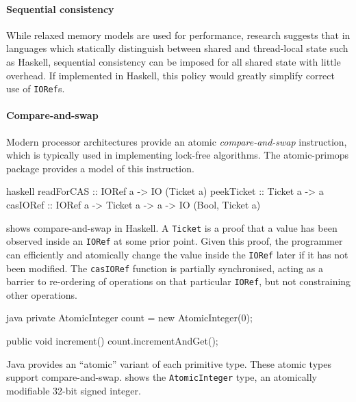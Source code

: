 \paragraph{Sequential consistency}
While relaxed memory models are used for performance, research
suggests that in languages which statically distinguish between shared
and thread-local state such as Haskell, sequential consistency can be
imposed for all shared state with little overhead\cite{vollmer2017}.
If implemented in Haskell, this policy would greatly simplify correct
use of \verb|IORef|s.

\paragraph{Compare-and-swap}
Modern processor architectures provide an atomic
\emph{compare-and-swap} instruction, which is typically used in
implementing lock-free algorithms\cite{dice2013}.  The
atomic-primops package\cite{atomic_primops} provides a model of this
instruction.

\begin{listing}
\centering
\begin{cminted}{haskell}
readForCAS :: IORef a -> IO (Ticket a)
peekTicket :: Ticket a -> a
casIORef   :: IORef a -> Ticket a -> a -> IO (Bool, Ticket a)
\end{cminted}
\caption{Compare-and-swap in Haskell.}\label{lst:cas_haskell}
\end{listing}

 shows compare-and-swap in Haskell.  A
\verb|Ticket| is a proof that a value has been observed inside an
\verb|IORef| at some prior point.  Given this proof, the programmer
can efficiently and atomically change the value inside the
\verb|IORef| later if it has not been modified.  The \verb|casIORef|
function is partially synchronised, acting as a barrier to re-ordering
of operations on that particular \verb|IORef|, but not constraining
other operations.

\begin{listing}
\centering
\begin{cminted}{java}
private AtomicInteger count = new AtomicInteger(0);

public void increment() {
  count.incrementAndGet();
}
\end{cminted}
\caption{Compare-and-swap in Java.}\label{lst:cas_java}
\end{listing}

Java provides an ``atomic'' variant of each primitive type.  These
atomic types support compare-and-swap.   shows the
\verb|AtomicInteger| type, an atomically modifiable 32-bit signed
integer.

